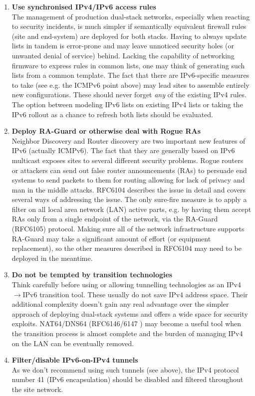\begin{enumerate}
\item {\bf Use synchronised IPv4/IPv6 access rules} \\
The management of production dual-stack networks, especially when reacting
to security incidents, is much simpler if semantically equivalent firewall rules
(site and end-system) are deployed for both stacks. Having to always
update lists in tandem is error-prone and may leave unnoticed security holes
(or unwanted denial of service) behind. Lacking the capability
of networking firmware to express rules in common lists, one may think
of generating such lists from a common template. The fact that there are
IPv6-specific measures to take (see e.g. the ICMPv6 point above) may lead
sites to assemble entirely new configurations. These should never forget {\it any}
of the existing IPv4 rules. The option between modeling IPv6 lists on
existing IPv4 lists or taking the IPv6 rollout as a chance to refresh
both lists should be evaluated.


\item {\bf Deploy RA-Guard or otherwise deal with Rogue RAs} \\
Neighbor Discovery and Router discovery are two important new features of IPv6
(actually ICMPv6).
The fact that they are generally based on IPv6 multicast exposes sites to several
different security problems. Rogue routers or attackers can send out false router
announcements (RAs) to persuade end systems to send packets to them
for routing allowing for lack of privacy and man in the middle attacks.
RFC6104 describes the issue in detail and covers 
several ways of addressing the issue. The only sure-fire measure is
to apply a filter on all local area network (LAN) active parts, e.g. by having
them accept RAs only from a single endpoint of the network, 
via the RA-Guard (RFC6105) protocol. Making sure all of the network infrastructure
supports RA-Guard may take a significant amount of effort (or equipment
replacement), so the other measures described in RFC6104 may need to
be deployed in the meantime.


\item {\bf Do not be tempted by transition technologies} \\
Think carefully before using or allowing 
tunnelling technologies as an IPv4$\rightarrow$IPv6 transition tool.
These usually do not save IPv4 address space. Their additional
complexity doesn't gain any real advantage over the simpler
approach of deploying dual-stack systems and offers a wide space
for security exploits. NAT64/DNS64 (RFC6146/6147 \cite{rfc}) may become
a useful tool when the transition process is almost complete and the burden
of managing IPv4 on the LAN can be eventually removed.

\item {\bf Filter/disable IPv6-on-IPv4 tunnels} \\
As we don't recommend using such tunnels (see above), the IPv4 protocol
number 41 (IPv6 encapsulation) should be disabled and filtered throughout
the site network.

\end{enumerate}



